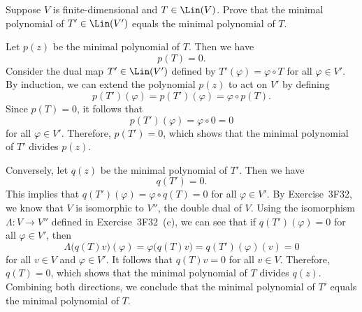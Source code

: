 \begin{exercise}
Suppose $V$ is finite-dimensional and $T\in\Lin(V)$. Prove that the minimal
polynomial of $T'\in\Lin(V')$ equals the minimal polynomial of $T$.
\end{exercise}
\begin{solution}
Let $p(z)$ be the minimal polynomial of $T$. Then we have
\[ p(T)=0. \]
Consider the dual map $T'\in\Lin(V')$ defined by $T'(\varphi)=\varphi\circ T$
for all $\varphi\in V'$. By induction, we can extend the polynomial $p(z)$ to
act on $V'$ by defining
\[ p(T')(\varphi)=p(T')(\varphi)=\varphi\circ p(T). \]
Since $p(T)=0$, it follows that
\[ p(T')(\varphi)=\varphi\circ0=0 \]
for all $\varphi\in V'$. Therefore, $p(T')=0$, which shows that the minimal
polynomial of $T'$ divides $p(z)$.

Conversely, let $q(z)$ be the minimal polynomial of $T'$. Then we have
\[ q(T')=0. \]
This implies that $q(T')(\varphi)=\varphi\circ q(T)=0$ for all
$\varphi\in V'$. By Exercise~3F32, we know that $V$ is isomorphic to $V''$,
the double dual of $V$. Using the isomorphism $\Lambda\colon V\to V''$ defined
in Exercise~3F32~(c), we can see that if $q(T')(\varphi)=0$ for all
$\varphi\in V'$, then
\[ \Lambda\bigl(q(T)v\bigr)(\varphi)=\varphi\bigl(q(T)v\bigr)
   =q(T')(\varphi)(v)=0 \]
for all $v\in V$ and $\varphi\in V'$. It follows that $q(T)v=0$ for all
$v\in V$. Therefore, $q(T)=0$, which shows that the minimal polynomial of $T$
divides $q(z)$. Combining both directions, we conclude that the minimal
polynomial of $T'$ equals the minimal polynomial of $T$.
\end{solution}

